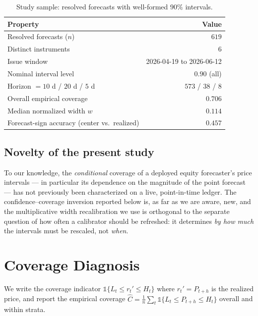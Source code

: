 \documentclass[11pt,a4paper]{article}
\begin{document}
\begin{table}[t]
\centering
\caption{Study sample: resolved forecasts with well-formed $90\%$ intervals.}
\label{tab:sample}
\small
\begin{tabular}{lr}
\toprule
Property & Value \\
\midrule
Resolved forecasts ($n$) & $619$ \\
Distinct instruments & $6$ \\
Issue window & 2026-04-19 to 2026-06-12 \\
Nominal interval level & $0.90$ (all) \\
Horizon $=10$ d / $20$ d / $5$ d & $573$ / $38$ / $8$ \\
Overall empirical coverage & $0.706$ \\
Median normalized width $w$ & $0.114$ \\
Forecast-sign accuracy (center vs.\ realized) & $0.457$ \\
\bottomrule
\end{tabular}
\end{table}

\subsection{Novelty of the present study}
To our knowledge, the \emph{conditional} coverage of a deployed equity forecaster's
price intervals --- in particular its dependence on the magnitude of the point forecast
--- has not previously been characterized on a live, point-in-time ledger. The
confidence--coverage inversion reported below is, as far as we are aware, new, and the
multiplicative width recalibration we use is orthogonal to the separate question of how
often a calibrator should be refreshed: it determines \emph{by how much} the intervals
must be rescaled, not \emph{when}.

\section{Coverage Diagnosis}\label{sec:diagnosis}
We write the coverage indicator $\mathbb{1}\{L_t\le r_t' \le H_t\}$ where
$r_t'=P_{t+h}$ is the realized price, and report the empirical coverage
$\widehat{C}=\tfrac1n\sum_t \mathbb{1}\{L_t\le P_{t+h}\le H_t\}$ overall and within
strata.
\end{document}
